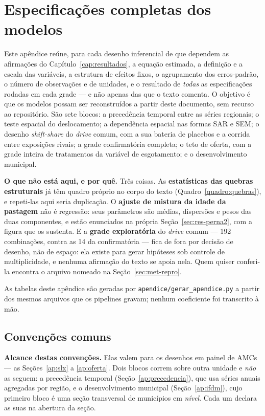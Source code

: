 \chapter{Especificações completas dos modelos}
\label{ap:especificacoes}

Este apêndice reúne, para cada desenho inferencial de que dependem as
afirmações do Capítulo~\ref{cap:resultados}, a equação estimada, a definição e
a escala das variáveis, a estrutura de efeitos fixos, o agrupamento dos
erros-padrão, o número de observações e de unidades, e o resultado de \emph{todas}
as especificações rodadas em cada grade --- e não apenas das que o texto
comenta. O objetivo é que os modelos possam ser reconstruídos a partir deste
documento, sem recurso ao repositório. São sete blocos: a precedência temporal
entre as séries regionais; o teste espacial do deslocamento; a dependência
espacial nas formas SAR e SEM; o desenho \emph{shift-share} do \emph{drive}
comum, com a sua bateria de placebos e a corrida entre exposições rivais; a
grade confirmatória completa; o teto de oferta, com a grade inteira de
tratamentos da variável de esgotamento; e o desenvolvimento municipal.

\textbf{O que não está aqui, e por quê.} Três coisas. As \textbf{estatísticas
das quebras estruturais} já têm quadro próprio no corpo do texto
(Quadro~\ref{quadro:quebras}), e repeti-las aqui seria duplicação. O
\textbf{ajuste de mistura da idade da pastagem} não é regressão: seus
parâmetros são médias, dispersões e pesos das duas componentes, e estão
enunciados na própria Seção~\ref{sec:res-perna2}, com a figura que os sustenta.
E a \textbf{grade exploratória} do \emph{drive} comum --- 192 combinações,
contra as 14 da confirmatória --- fica de fora por decisão de desenho, não de
espaço: ela existe para gerar hipóteses sob controle de multiplicidade, e
nenhuma afirmação do texto se apoia nela. Quem quiser conferi-la encontra o
arquivo nomeado na Seção~\ref{sec:met-repro}.

As tabelas deste apêndice são geradas por \texttt{apendice/gerar\_apendice.py} a
partir dos mesmos arquivos que os pipelines gravam; nenhum coeficiente foi
transcrito à mão.

\section{Convenções comuns}
\label{ap:convencoes}

\textbf{Alcance destas convenções.} Elas valem para os desenhos em painel de
AMCs --- as Seções~\ref{ap:slx} a \ref{ap:oferta}. Dois blocos correm sobre
outra unidade e \emph{não} as seguem: a precedência temporal
(Seção~\ref{ap:precedencia}), que usa séries anuais agregadas por região, e o
desenvolvimento municipal (Seção~\ref{ap:ifdm}), cujo primeiro bloco é uma
seção transversal de municípios em \emph{nível}. Cada um declara as suas na
abertura da seção.

